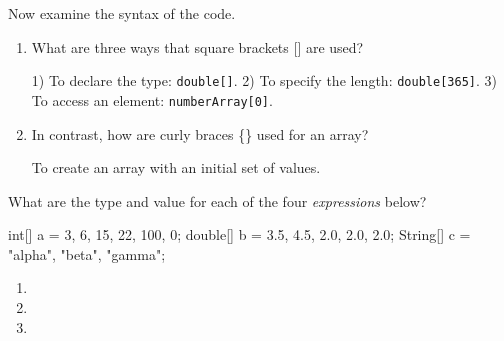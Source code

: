 \Q Now examine the syntax of the code.

\begin{enumerate}
\item What are three ways that square brackets [] are used?

\vspace{-1ex}
\begin{answer}[2em]
1) To declare the type: {\tt double[]}.
2) To specify the length: {\tt double[365]}.
3) To access an element: {\tt numberArray[0]}.
\end{answer}

\item In contrast, how are curly braces \{\} used for an array?

\vspace{-1ex}
\begin{answer}[1em]
To create an array with an initial set of values.
\end{answer}
\end{enumerate}


\newpage

\Q What are the type and value for each of the four \emph{expressions} below?

\begin{javalst}
int[] a = {3, 6, 15, 22, 100, 0};
double[] b = {3.5, 4.5, 2.0, 2.0, 2.0};
String[] c = {"alpha", "beta", "gamma"};
\end{javalst}

\begin{enumerate}
\item {}

\item {}

\item {}

\end{enumerate}


